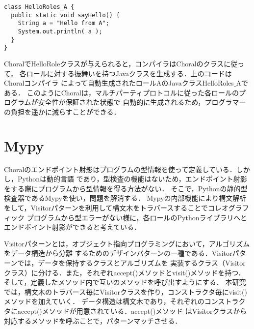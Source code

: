 \documentclass[11pt]{jarticle}
\begin{document}
\newpage
\begin{lstlisting}[caption = HelloRoles(generated Java program)]
class HelloRoles_A {
  public static void sayHello() {
    String a = "Hello from A";
    System.out.println( a );
  }
}
\end{lstlisting} 
ChoralでHelloRoleクラスが与えられると，コンパイラはChoralのクラスに従って，
各ロールに対する振舞いを持つJavaクラスを生成する．上のコードはChoralコンパイラ
によって自動生成されたロールAのJavaクラスHelloRoles$\_$Aである．
このようにChoralは，マルチパーティプロトコルに従った各ロールのプログラムが安全性が保証された状態で
自動的に生成されるため，プログラマーの負担を遥かに減らすことができる．
\section{Mypy}
Choralのエンドポイント射影はプログラムの型情報を使って定義している．しかし，Pythonは動的言語
であり，型検査の機能はないため，エンドポイント射影をする際にプログラムから型情報を得る方法がない．
そこで，Pythonの静的型検査器であるMypyを使い，問題を解消する．
Mypyの内部機能により構文解析をして，Visitorパターンを利用して構文木をトラバースすることでコレオグラフィック
プログラムから型エラーがない様に，各ロールのPythonライブラリへとエンドポイント射影ができると考えている．

Visitorパターンとは，オブジェクト指向プログラミングにおいて，アルゴリズムをデータ構造から分離
するためのデザインパターンの一種である．Visitorパターンでは，データを保持するクラスとアルゴリズムを
実装するクラス（Visitorクラス）に分ける．また，それぞれaccept()メソッドとvisit()メソッドを持つ．
そして，定義したメソッド内で互いのメソッドを呼び出すようにする．
本研究では，構文木のトラバース毎にVisitorクラスを作り，コンストラクタ毎にvisit()メソッドを加えていく．
データ構造は構文木であり，それぞれのコンストラクタにaccept()メソッドが用意されている．accept()メソッド
はVisitorクラスから対応するメソッドを呼ぶことで，パターンマッチさせる．

%
%
\end{document}
